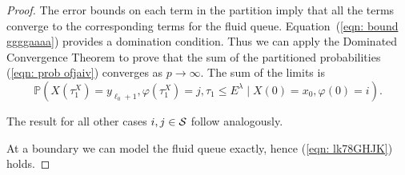 \begin{proof}
	The error bounds on each term in the partition imply that all the terms converge to the corresponding terms for the fluid queue. Equation~(\ref{eqn: bound ggggaaaa}) provides a domination condition. Thus we can apply the Dominated Convergence Theorem to prove that the sum of the partitioned probabilities (\ref{eqn: prob ofjaiv}) converges as \(p\to\infty\). The sum of the limits is 
	\[\mathbb P(X(\tau_1^X) = y_{\ell_0+1}, \varphi(\tau_1^X) = j, \tau_{1}\leq E^\lambda 
            	 \mid X(0) = x_0, \varphi(0) = i).\]
	 
	 The result for all other cases \(i,j\in\mathcal{S}\) follow analogously.
	
	At a boundary we can model the fluid queue exactly, hence (\ref{eqn: lk78GHJK}) holds.
	
%	
%	
	

\end{proof}
